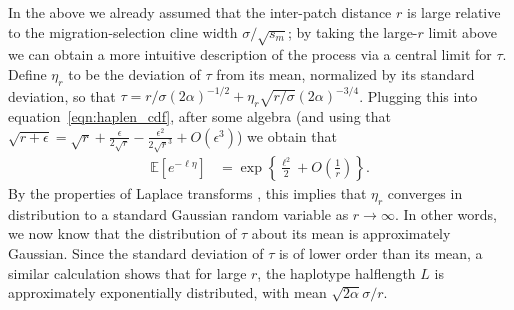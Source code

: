 \documentclass{article}
\newcommand{\E}{\mathbb{E}}
\begin{document}
In the above we already assumed that the inter-patch distance $r$ is large relative to the migration-selection cline width $\sigma/\sqrt{s_m}$;
by taking the large-$r$ limit above we can obtain a more intuitive description of the process
via a central limit for $\tau$.
Define $\eta_r$ to be the deviation of $\tau$ from its mean, normalized by its standard deviation,
so that $\tau = r/\sigma(2\alpha)^{-1/2} + \eta_r \sqrt{r/\sigma} (2\alpha)^{-3/4}$.
Plugging this into equation~\eqref{eqn:haplen_cdf},
after some algebra (and using that $\sqrt{r+\epsilon} = \sqrt{r} + \frac{\epsilon}{2\sqrt{r}} - \frac{\epsilon^2}{2\sqrt{r}^3} + O(\epsilon^3)$) we obtain that
\begin{align}
  \E[e^{-\ell \eta}] &= \exp\left\{ \frac{\ell^2}{2} + O\left(\frac{1}{r}\right) \right\}.
\end{align}
By the properties of Laplace transforms \citep{durrett},
this implies that $\eta_r$ converges in distribution to a standard Gaussian random variable as $r \to \infty$.
In other words, we now know that the distribution of $\tau$ about its mean is approximately Gaussian.
Since the standard deviation of $\tau$ is of lower order than its mean,
a similar calculation shows that for large $r$, the haplotype halflength $L$ is approximately exponentially distributed, 
with mean $\sqrt{2\alpha} \sigma/r$.



\end{document}
